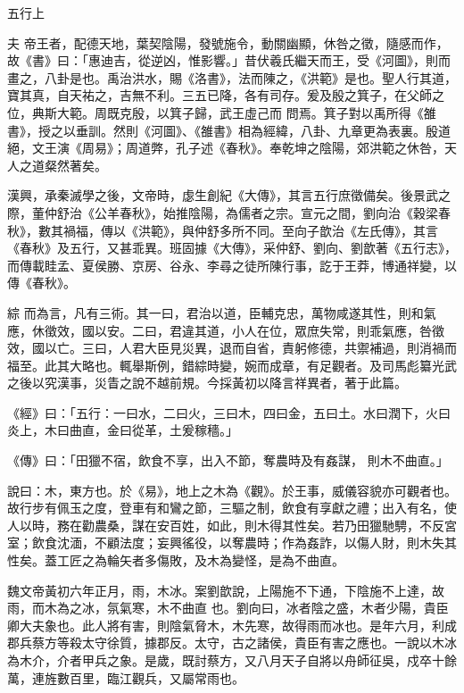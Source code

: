 
\begin{pinyinscope}

 五行上



 夫
 帝王者，配德天地，葉契陰陽，發號施令，動關幽顯，休咎之徵，隨感而作，故《書》曰：「惠迪吉，從逆凶，惟影響。」昔伏羲氏繼天而王，受《河圖》，則而畫之，八卦是也。禹治洪水，賜《洛書》，法而陳之，《洪範》是也。聖人行其道，寶其真，自天祐之，吉無不利。三五已降，各有司存。爰及殷之箕子，在父師之位，典斯大範。周既克殷，以箕子歸，武王虛己而
 問焉。箕子對以禹所得《雒書》，授之以垂訓。然則《河圖》、《雒書》相為經緯，八卦、九章更為表裏。殷道絕，文王演《周易》；周道弊，孔子述《春秋》。奉乾坤之陰陽，郊洪範之休咎，天人之道粲然著矣。



 漢興，承秦滅學之後，文帝時，虙生創紀《大傳》，其言五行庶徵備矣。後景武之際，董仲舒治《公羊春秋》，始推陰陽，為儒者之宗。宣元之間，劉向治《穀梁春秋》，數其禍福，傳以《洪範》，與仲舒多所不同。至向子歆治《左氏傳》，其言《春秋》及五行，又甚乖異。班固據《大傳》，采仲舒、劉向、劉歆著《五行志》，而傳載眭孟、夏侯勝、京房、谷永、李尋之徒所陳行事，訖于王莽，博通祥變，以傳《春秋》。



 綜
 而為言，凡有三術。其一曰，君治以道，臣輔克忠，萬物咸遂其性，則和氣應，休徵效，國以安。二曰，君違其道，小人在位，眾庶失常，則乖氣應，咎徵效，國以亡。三曰，人君大臣見災異，退而自省，責躬修德，共禦補過，則消禍而福至。此其大略也。輒舉斯例，錯綜時變，婉而成章，有足觀者。及司馬彪纂光武之後以究漢事，災眚之說不越前規。今採黃初以降言祥異者，著于此篇。



 《經》曰：「五行：一曰水，二曰火，三曰木，四曰金，五曰土。水曰潤下，火曰炎上，木曰曲直，金曰從革，土爰稼穡。」



 《傳》曰：「田獵不宿，飲食不享，出入不節，奪農時及有姦謀，
 則木不曲直。」



 說曰：木，東方也。於《易》，地上之木為《觀》。於王事，威儀容貌亦可觀者也。故行步有佩玉之度，登車有和鸞之節，三驅之制，飲食有享獻之禮；出入有名，使人以時，務在勸農桑，謀在安百姓，如此，則木得其性矣。若乃田獵馳騁，不反宮室；飲食沈湎，不顧法度；妄興徭役，以奪農時；作為姦詐，以傷人財，則木失其性矣。蓋工匠之為輪矢者多傷敗，及木為變怪，是為不曲直。



 魏文帝黃初六年正月，雨，木冰。案劉歆說，上陽施不下通，下陰施不上達，故雨，而木為之冰，氛氣寒，木不曲直
 也。劉向曰，冰者陰之盛，木者少陽，貴臣卿大夫象也。此人將有害，則陰氣脅木，木先寒，故得雨而冰也。是年六月，利成郡兵蔡方等殺太守徐質，據郡反。太守，古之諸侯，貴臣有害之應也。一說以木冰為木介，介者甲兵之象。是歲，既討蔡方，又八月天子自將以舟師征吳，戍卒十餘萬，連旌數百里，臨江觀兵，又屬常雨也。




\end{pinyinscope}
